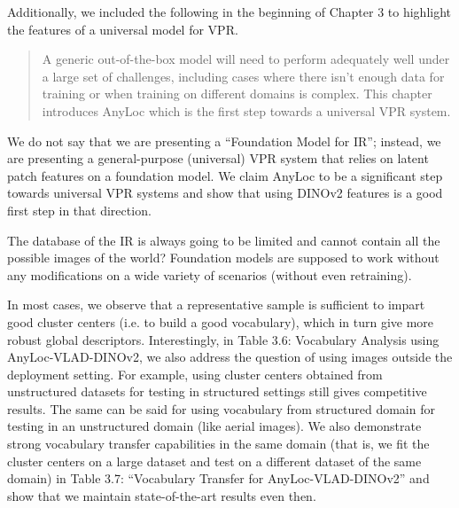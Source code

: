 Additionally, we included the following in the beginning of Chapter 3
to highlight the features of a universal model for VPR.

\begin{quote}
    A generic out-of-the-box model will need to perform adequately
    well under a large set of challenges, including cases where there
    isn't enough data for training or when training on different
    domains is complex. This chapter introduces AnyLoc which is the
    first step towards a universal VPR system.
\end{quote}

We do not say that we are presenting a ``Foundation Model for IR'';
instead, we are presenting a general-purpose (universal) VPR system
that relies on latent patch features on a foundation model. We claim
AnyLoc to be a significant step towards universal VPR systems and show
that using DINOv2 features is a good first step in that direction.

\begin{tcolorbox}
    The database of the IR is always going to be limited and
    cannot contain all the possible images of the world? Foundation
    models are supposed to work without any modifications on a wide
    variety of scenarios (without even retraining).
\end{tcolorbox}

In most cases, we observe that a representative sample is sufficient
to impart good cluster centers (i.e. to build a good vocabulary),
which in turn give more robust global descriptors. Interestingly, in
Table 3.6: Vocabulary Analysis using AnyLoc-VLAD-DINOv2, we also
address the question of using images outside the deployment setting.
For example, using cluster centers obtained from unstructured datasets
for testing in structured settings still gives competitive results.
The same can be said for using vocabulary from structured domain for
testing in an unstructured domain (like aerial images). We also
demonstrate strong vocabulary transfer capabilities in the same domain
(that is, we fit the cluster centers on a large dataset and test on a
different dataset of the same domain) in Table 3.7: ``Vocabulary
Transfer for AnyLoc-VLAD-DINOv2'' and show that we maintain
state-of-the-art results even then.



